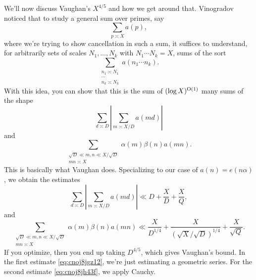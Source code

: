 \documentclass[reqno]{amsart} 
\begin{document}
We'll now discuss Vaughan's $X^{4/5}$ and how we get around that.  Vinogradov noticed that to study a general sum over primes, say
\begin{equation*}
  \sum_{p \asymp X}
  a(p),
\end{equation*}
where we're trying to show cancellation in such a sum, it suffices to understand, for arbitrarily sets of scales $N_1, \dotsc, N_k$ with $N_1 \dotsb N_k = X$, sums of the sort
\begin{equation*}
  \sum_{
    \substack{
      n_1 \asymp N_1  \\
      \dotsb \\
      n_k \asymp N_k
    }
  }
  a(n_1 \dotsb n_k).
\end{equation*}
With this idea, you can show that this is the sum of $(\log X)^{\operatorname{O}(1)}$ many sums of the shape
\begin{equation*}
  \sum_{d \asymp D}
  \left| \sum_{m \asymp X / D}
    a(m d)
  \right|
\end{equation*}
and
\begin{equation*}
  \sum_{
    \substack{
      \sqrt{D} \ll
      m, n
      \ll X / \sqrt{D}
      \\
      m n \asymp X
    }
  }
  \alpha(m) \beta(n) a(m n).
\end{equation*}
This is basically what Vaughan does.  Specializing to our case of $a(n) = e(n \alpha)$, we obtain the estimates
\begin{equation}\label{eq:cnoj8jgz12}
  \sum_{d \asymp D}
  \left| \sum_{m \asymp X / D}
    a(m d)
  \right|
  \ll D + \frac{X}{D} + \frac{X}{Q},
\end{equation}
and
\begin{equation}\label{eq:cnoj8jh43f}
  \sum_{
    \substack{
      \sqrt{D} \ll
      m, n
      \ll X / \sqrt{D}
      \\
      m n \asymp X
    }
  }
  \alpha(m) \beta(n) a(m n)
  \ll
  \frac{X}{ D^{1/4}}
  + \frac{X}{(\sqrt{X} / \sqrt{D})^{1/4}} +
  \frac{X}{ \sqrt{Q}}.
\end{equation}
If you optimize, then you end up taking $D^{4/5}$, which gives Vaughan's bound.  In the first estimate \eqref{eq:cnoj8jgz12}, we're just estimating a geometric series.  For the second estimate \eqref{eq:cnoj8jh43f}, we apply Cauchy.
\end{document}
